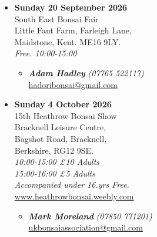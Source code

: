 \begin{itemize}
    \item \textbf{Sunday 20 September 2026}
    \\
    South East Bonsai Fair \\
    Little Fant Farm, Farleigh Lane, \\
    Maidstone, Kent. ME16 9LY.
    \\
    \emph{Free. 10:00-15:00}
    \begin{itemize}
        \item \textbf{\emph{Adam Hadley}} \emph{(07765 522117)} \\
        \href{mailto:hadoribonsai@gmail.com}{hadoribonsai@gmail.com} 
    \end{itemize}

    \item \textbf{Sunday 4 October 2026}
    \\
    15th Heathrow Bonsai Show \\
    Bracknell Leisure Centre, \\
    Bagshot Road, Bracknell, \\
    Berkshire, RG12 9SE.
    \\
    \emph{10:00-15:00 £10 Adults} \\
    \emph{15:00-16:00 £5 Adults} \\
    \emph{Accompanied under 16.yrs Free.}
    \\
    \href{http://www.heathrowbonsai.weebly.com/}{www.heathrowbonsai.weebly.com}
    \begin{itemize}
        \item \textbf{\emph{Mark Moreland}} \emph{(07850 771201)} \\
        \href{mailto:ukbonsaiassociation@gmail.com}{ukbonsaiassociation@gmail.com} 
    \end{itemize}

\end{itemize}
\closearticle